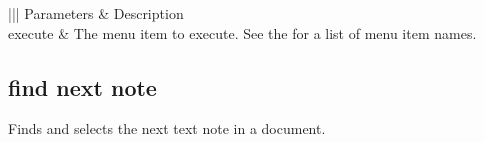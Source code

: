 \documentclass[letterpaper,12pt,english,openany,oneside]{sphinxmanual}
\begin{document}
\begin{savenotes}\sphinxattablestart
\centering
{}\label{\detokenize{IAC_API_AppleEvtObjects:section-34}}\nobreak
\begin{tabular}[t]{|||}
\hline
\sphinxstyletheadfamily 
Parameters
&\sphinxstyletheadfamily 
Description
\\
\hline
execute
&
The menu item to execute. See the  for a list of menu item names.
\\
\hline
\end{tabular}
\par
\sphinxattableend\end{savenotes}
\label{\detokenize{IAC_API_AppleEvtObjects:applescript-example-15}}

\begin{sphinxVerbatim}[commandchars=\\\{\}]
   
\end{sphinxVerbatim}
\label{\detokenize{IAC_API_AppleEvtObjects:apple-event-id-6}}

\begin{sphinxVerbatim}[commandchars=\\\{\}]
 
\end{sphinxVerbatim}




\subsection{find next note}
\label{\detokenize{IAC_API_AppleEvtObjects:find-next-note}}
Finds and selects the next text note in a document.

\label{\detokenize{IAC_API_AppleEvtObjects:syntax-19}}

\begin{sphinxVerbatim}[commandchars=\\\{\}]
  
 \PYG{p}{[}\PYG{p}{]}  
 \PYG{p}{[}\PYG{p}{]}
\end{sphinxVerbatim}
\label{\detokenize{IAC_API_AppleEvtObjects:parameters-20}}
\end{document}
